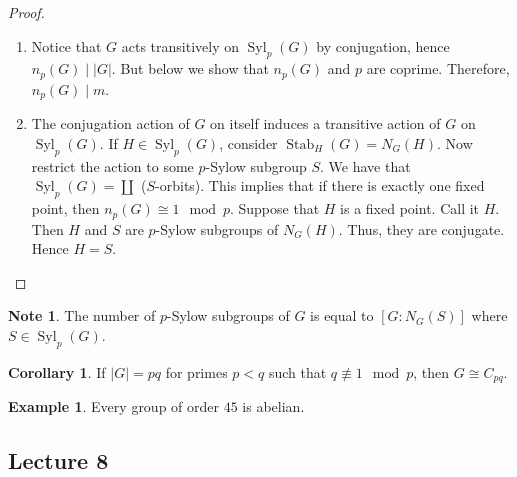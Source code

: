 \documentclass[10pt,letterpaper,cm]{nupset}
\theoremstyle{definition}
\newtheorem{exmp}{Example}
\newtheorem{note}{Note}
\newtheorem{corollary}{Corollary}
\newcommand{\1}{\mathbf{1}}
\newcommand{\0}{\vec 0}
\DeclareMathOperator{\stab}{Stab}
\DeclareMathOperator{\Syl}{Syl}
\begin{document}
\begin{proof} $ $
\begin{enumerate}
\item Notice that $G$ acts transitively on $\Syl_p(G)$ by conjugation, hence $n_p(G) \mid |G|$. But below we show that $n_p(G)$ and $p$ are coprime. Therefore, $n_p(G) \mid m$.
\item The conjugation action of $G$ on itself induces a transitive action of $G$ on $\Syl_p(G)$. If $H \in \Syl_p(G)$, consider $\stab_H(G) = N_G(H)$. Now restrict the action to some $p$-Sylow subgroup $S$. We have  that $\Syl_p(G) = \coprod$ ($S$-orbits). This implies that if there is exactly one fixed point, then $n_p(G) \cong 1 \mod p$. Suppose that $H$ is a fixed point. Call it $H$. Then $H$ and $S$  are $p$-Sylow subgroups of $N_G(H)$. Thus, they are conjugate. Hence $H=S$.
\end{enumerate}
\end{proof}

\begin{note}
The number of $p$-Sylow subgroups of $G$ is equal to $[G : N_G(S)]$ where $S\in \Syl_p(G)$.
\end{note}

\begin{corollary}
If $|G| = pq$ for primes $p<q$ such that $q \not \equiv 1 \mod p$, then $G\cong C_{pq}$. 
\end{corollary}

\begin{exmp}
Every group of order $45$ is abelian.
\end{exmp}

\subsection{Lecture 8}
\end{document}
